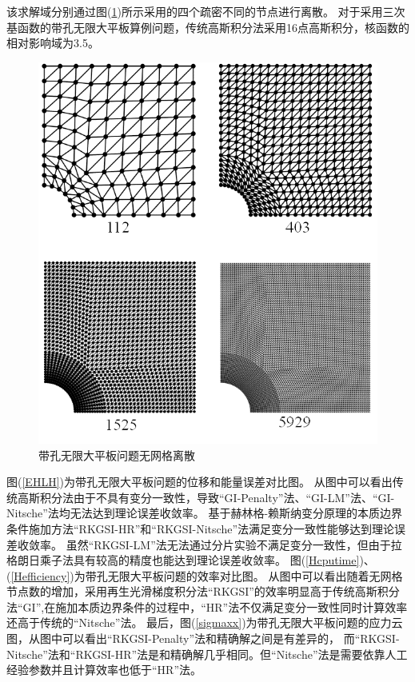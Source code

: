 该求解域分别通过图(\ref{hole.mesh})所示采用的四个疏密不同的节点进行离散。
对于采用三次基函数的带孔无限大平板算例问题，传统高斯积分法采用16点高斯积分，核函数的相对影响域为3.5。\par
\begin{figure}[H]
\centering
 \includegraphics[scale=0.8]{figure/EHR/hole/hole.mesh.png}
   \caption{带孔无限大平板问题无网格离散}\label{hole.mesh}
\end{figure}
图(\ref{EHLH})为带孔无限大平板问题的位移和能量误差对比图。
从图中可以看出传统高斯积分法由于不具有变分一致性，导致“GI-Penalty”法、“GI-LM”法、“GI-Nitsche”法均无法达到理论误差收敛率。
基于赫林格-赖斯纳变分原理的本质边界条件施加方法“RKGSI-HR”和“RKGSI-Nitsche”法满足变分一致性能够达到理论误差收敛率。
虽然“RKGSI-LM”法无法通过分片实验不满足变分一致性，但由于拉格朗日乘子法具有较高的精度也能达到理论误差收敛率。
图(\ref{Hcputime})、(\ref{Hefficiency})为带孔无限大平板问题的效率对比图。
从图中可以看出随着无网格节点数的增加，采用再生光滑梯度积分法“RKGSI”的效率明显高于传统高斯积分法“GI”,在施加本质边界条件的过程中，“HR”法不仅满足变分一致性同时计算效率还高于传统的“Nitsche”法。
最后，图(\ref{sigmaxx})为带孔无限大平板问题的应力云图，从图中可以看出“RKGSI-Penalty”法和精确解之间是有差异的，
而“RKGSI-Nitsche”法和“RKGSI-HR”法是和精确解几乎相同。但“Nitsche”法是需要依靠人工经验参数并且计算效率也低于“HR”法。
